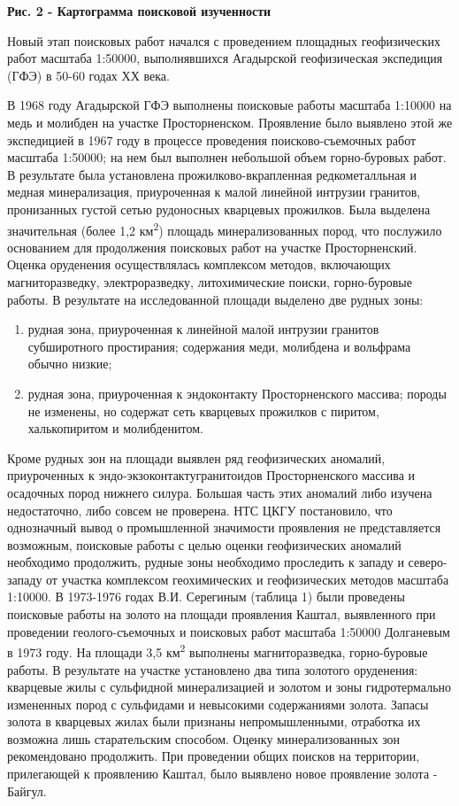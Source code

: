 {\bfseries Рис. 2 - Картограмма поисковой изученности}

Новый этап поисковых работ начался с проведением площадных геофизических
работ масштаба 1:50000, выполнявшихся Агадырской геофизическая
экспедиция (ГФЭ) в 50-60 годах ХХ века.

В 1968 году Агадырской ГФЭ выполнены поисковые работы масштаба 1:10000
на медь и молибден на участке Просторненском. Проявление было выявлено
этой же экспедицией в 1967 году в процессе проведения поисково-съемочных
работ масштаба 1:50000; на нем был выполнен небольшой объем
горно-буровых работ. В результате была установлена
прожилково-вкрапленная редкометалльная и медная минерализация,
приуроченная к малой линейной интрузии гранитов, пронизанных густой
сетью рудоносных кварцевых прожилков. Была выделена значительная (более
1,2 км\textsuperscript{2}) площадь минерализованных пород, что послужило
основанием для продолжения поисковых работ на участке Просторненский.
Оценка оруденения осуществлялась комплексом методов, включающих
магниторазведку, электроразведку, литохимические поиски, горно-буровые
работы. В результате на исследованной площади выделено две рудных зоны:

\begin{enumerate}
\def\labelenumi{\alph{enumi})}
\item
  рудная зона, приуроченная к линейной малой интрузии гранитов
  субширотного простирания; содержания меди, молибдена и вольфрама
  обычно низкие;
\item
  рудная зона, приуроченная к эндоконтакту Просторненского массива;
  породы не изменены, но содержат сеть кварцевых прожилков с пиритом,
  халькопиритом и молибденитом.
\end{enumerate}

Кроме рудных зон на площади выявлен ряд геофизических аномалий,
приуроченных к эндо-экзоконтактугранитоидов Просторненского массива и
осадочных пород нижнего силура. Большая часть этих аномалий либо изучена
недостаточно, либо совсем не проверена. НТС ЦКГУ постановило, что
однозначный вывод о промышленной значимости проявления не представляется
возможным, поисковые работы с целью оценки геофизических аномалий
необходимо продолжить, рудные зоны необходимо проследить к западу и
северо-западу от участка комплексом геохимических и геофизических
методов масштаба 1:10000. В 1973-1976 годах В.И. Серегиным (таблица 1)
были проведены поисковые работы на золото на площади проявления Каштал,
выявленного при проведении геолого-съемочных и поисковых работ масштаба
1:50000 Долганевым в 1973 году. На площади 3,5 км\textsuperscript{2}
выполнены магниторазведка, горно-буровые работы. В результате на участке
установлено два типа золотого оруденения: кварцевые жилы с сульфидной
минерализацией и золотом и зоны гидротермально измененных пород с
сульфидами и невысокими содержаниями золота. Запасы золота в кварцевых
жилах были признаны непромышленными, отработка их возможна лишь
старательским способом. Оценку минерализованных зон рекомендовано
продолжить. При проведении общих поисков на территории, прилегающей к
проявлению Каштал, было выявлено новое проявление золота - Байгул.


